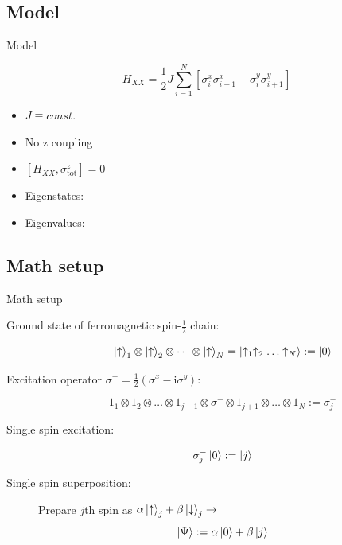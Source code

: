 \documentclass{beamer}
\begin{document}
\subsection{Model}
\begin{frame}[t]{Model}	
	\begin{exampleblock}{}
	\setlength\abovedisplayskip{-8pt}
	\begin{center}
		\[H_{XX}=\frac{1}{2}J\sum_{i=1}^{N}{\left[\sigma_i^x\sigma_{i+1}^x + \sigma_i^y\sigma_{i+1}^y\right]}\]
	\end{center}
	\end{exampleblock}
	\begin{itemize}
		\item $J\equiv const.$
		\item No z coupling
		\item $\left[H_{XX},\sigma^z_\text{tot}\right] = 0$
		\item Eigenstates: $ $
		\item Eigenvalues: $ $
	\end{itemize}
\end{frame}

\subsection{Math setup}
\begin{frame}{Math setup}
	\begin{description}
	\item [Ground state of ferromagnetic spin-$\frac{1}{2}$ chain:] \[ \ket{\uparrow}_1 \otimes \ket{\uparrow}_2 \otimes \dots \otimes \ket{\uparrow}_N = \ket{\uparrow_1\uparrow_2\dots\uparrow_N} := \ket{0} \]
	\item [Excitation operator $\sigma^- = \frac{1}{2}\left(\sigma^x - \text{i}\sigma^y\right)$:] \[ \text{1}_1 \otimes \text{1}_2 \otimes \dots \otimes \text{1}_{j-1} \otimes \sigma^- \otimes \text{1}_{j+1} \otimes \dots \otimes \text{1}_N := \sigma^-_j \]
	\item [Single spin excitation:] \[ \sigma^-_j\ket{0} := \ket{j} \]
	\item [Single spin superposition:] Prepare $j$th spin as $\alpha\ket{\uparrow}_j + \beta\ket{\downarrow}_j \rightarrow$ \[ \ket{\Psi} := \alpha\ket{0} + \beta\ket{j} \]
	\end{description}
\end{frame}
\end{document}
